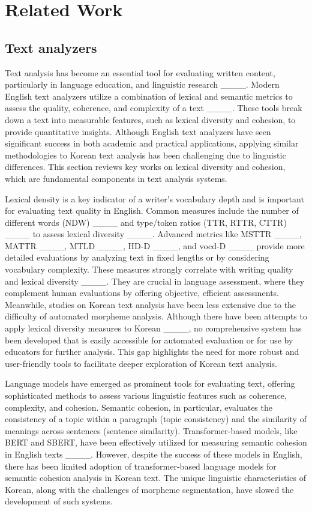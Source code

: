\section{Related Work}
\label{sec:02_relatedworks}

\subsection{Text analyzers} 

Text analysis has become an essential tool for evaluating written content, particularly in language education, and linguistic research ____. Modern English text analyzers utilize a combination of lexical and semantic metrics to assess the quality, coherence, and complexity of a text ____. These tools break down a text into measurable features, such as lexical diversity and cohesion, to provide quantitative insights. Although English text analyzers have seen significant success in both academic and practical applications, applying similar methodologies to Korean text analysis has been challenging due to linguistic differences. This section reviews key works on lexical diversity and cohesion, which are fundamental components in text analysis systems. 

Lexical density is a key indicator of a writer's vocabulary depth and is important for evaluating text quality in English. Common measures include the number of different words (NDW) ____ and type/token ratios (TTR, RTTR, CTTR) ____ to assess lexical diversity ____. Advanced metrics like MSTTR ____, MATTR ____, MTLD ____, HD-D ____, and vocd-D ____ provide more detailed evaluations by analyzing text in fixed lengths or by considering vocabulary complexity. These measures strongly correlate with writing quality and lexical diversity ____. They are crucial in language assessment, where they complement human evaluations by offering objective, efficient assessments. Meanwhile, studies on Korean text analysis have been less extensive due to the difficulty of automated morpheme analysis. Although there have been attempts to apply lexical diversity measures to Korean ____, no comprehensive system has been developed that is easily accessible for automated evaluation or for use by educators for further analysis. This gap highlights the need for more robust and user-friendly tools to facilitate deeper exploration of Korean text analysis. 

Language models have emerged as prominent tools for evaluating text, offering sophisticated methods to assess various linguistic features such as coherence, complexity, and cohesion. Semantic cohesion, in particular, evaluates the consistency of a topic within a paragraph (topic consistency) and the similarity of meanings across sentences (sentence similarity). Transformer-based models, like BERT and SBERT, have been effectively utilized for measuring semantic cohesion in English texts ____. However, despite the success of these models in English, there has been limited adoption of transformer-based language models for semantic cohesion analysis in Korean text. The unique linguistic characteristics of Korean, along with the challenges of morpheme segmentation, have slowed the development of such systems. 


